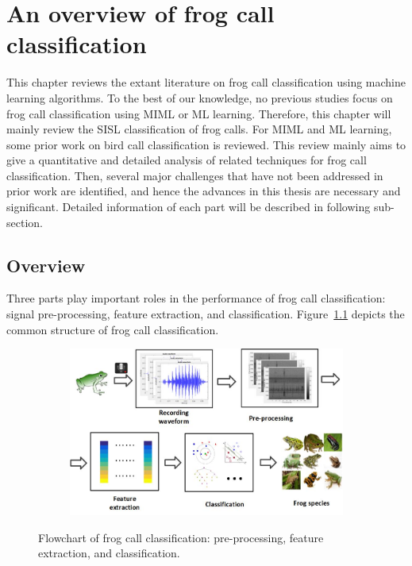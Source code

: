 
\chapter[Literature review]{An overview of frog call classification}
\label{cha:cha2LiteratureReview}

This chapter reviews the extant literature on frog call classification using machine learning algorithms. To the best of our knowledge, no previous studies focus on frog call classification using MIML or ML learning. Therefore, this chapter will mainly review the SISL  classification of frog calls. For MIML and ML learning, some prior work on bird call classification is reviewed. This review mainly aims to give a quantitative and detailed analysis of related techniques for frog call classification. 
Then, several major challenges that have not been addressed in prior work are identified, and hence the advances in this thesis are necessary and significant. Detailed information of each part will be described in following sub-section.

\section{Overview}
Three parts play important roles in the performance of frog call classification: signal pre-processing, feature extraction, and classification. Figure~\ref{ch2:fig:flowchart} depicts the common structure of frog call classification.

\begin{figure}[htb!]
\centering
    \begin{subfigure}[b]{\textwidth}
           \includegraphics[width=\textwidth]{image/Ch1/flowchart.jpg}
    \end{subfigure}%
\caption[Flowchart of frog call classification]{Flowchart of frog call classification: pre-processing, feature extraction, and classification.}
\label{ch2:fig:flowchart}       
\end{figure}



